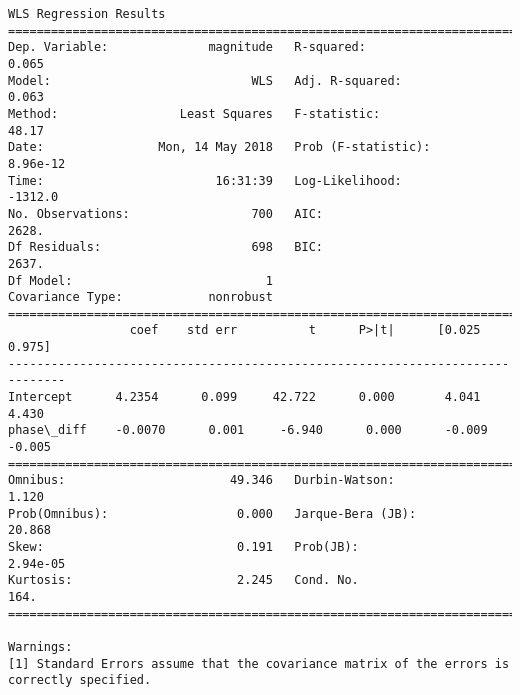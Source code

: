 \documentclass[11pt]{article}
\begin{document}
    \begin{Verbatim}[commandchars=\\\{\}]
                            WLS Regression Results                            
==============================================================================
Dep. Variable:              magnitude   R-squared:                       0.065
Model:                            WLS   Adj. R-squared:                  0.063
Method:                 Least Squares   F-statistic:                     48.17
Date:                Mon, 14 May 2018   Prob (F-statistic):           8.96e-12
Time:                        16:31:39   Log-Likelihood:                -1312.0
No. Observations:                 700   AIC:                             2628.
Df Residuals:                     698   BIC:                             2637.
Df Model:                           1                                         
Covariance Type:            nonrobust                                         
==============================================================================
                 coef    std err          t      P>|t|      [0.025      0.975]
------------------------------------------------------------------------------
Intercept      4.2354      0.099     42.722      0.000       4.041       4.430
phase\_diff    -0.0070      0.001     -6.940      0.000      -0.009      -0.005
==============================================================================
Omnibus:                       49.346   Durbin-Watson:                   1.120
Prob(Omnibus):                  0.000   Jarque-Bera (JB):               20.868
Skew:                           0.191   Prob(JB):                     2.94e-05
Kurtosis:                       2.245   Cond. No.                         164.
==============================================================================

Warnings:
[1] Standard Errors assume that the covariance matrix of the errors is correctly specified.

    \end{Verbatim}
\end{document}
